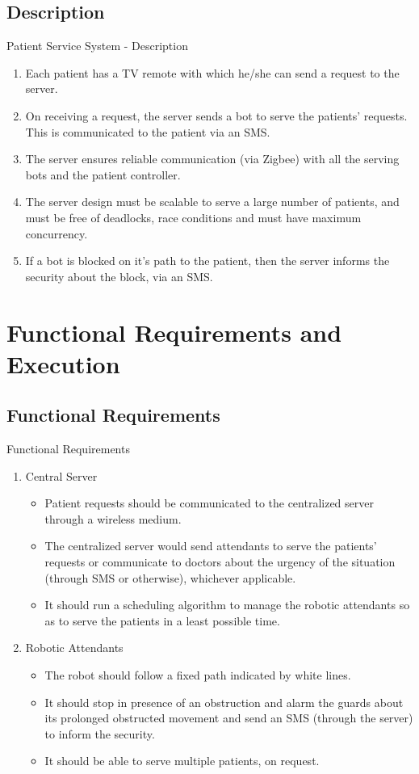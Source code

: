 \documentclass{beamer}
\begin{document}
\subsection{Description}
\begin{frame}{Patient Service System - Description}
\begin{enumerate}
\item Each patient has a TV remote with which he/she can send a request to the server.
\item On receiving a request, the server sends a bot to serve the patients' requests. This is communicated to the patient via an SMS.
\item The server ensures reliable communication (via Zigbee) with all the serving bots and the patient controller.
\item The server design must be scalable to serve a large number of patients, and must be free of deadlocks, race conditions and must have maximum concurrency.
\item If a bot is blocked on it's path to the patient, then the server informs the security about the block, via an SMS.
\end{enumerate}
\end{frame}

\section{Functional Requirements and Execution}
\subsection{Functional Requirements}
\begin{frame}{Functional Requirements}
\begin{enumerate}
\item Central Server
\begin{itemize}
\item Patient requests should be communicated to the centralized server through a wireless medium.
\item  The centralized server would send attendants to serve the patients' requests or communicate to doctors about the urgency of the situation (through SMS or otherwise), whichever applicable.
\item  It should run a scheduling algorithm to manage the robotic attendants so as to serve the patients in a least possible time.
\end{itemize}
\item Robotic Attendants
\begin{itemize}
\item  The robot should follow a fixed path indicated by white lines.
\item  It should stop in presence of an obstruction and alarm the guards about its prolonged obstructed movement and send an SMS (through the server) to inform the security.
\item  It should be able to serve multiple patients, on request.
\end{itemize}
\end{enumerate}
\end{frame}   
\end{document}
